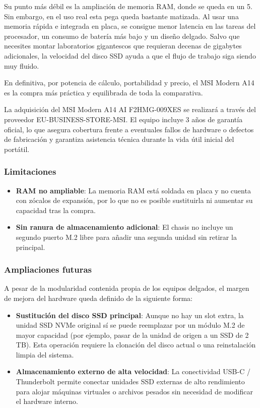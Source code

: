 \documentclass[11.5pt]{article}
\begin{document}
	Su punto más débil es la ampliación de memoria RAM, donde se queda en un 5. Sin embargo, en el uso real esta pega queda bastante matizada. Al usar una memoria rápida e integrada en placa, se consigue menor latencia en las tareas del procesador, un consumo de batería más bajo y un diseño delgado. Salvo que necesites montar laboratorios gigantescos que requieran decenas de gigabytes adicionales, la velocidad del disco SSD ayuda a que el flujo de trabajo siga siendo muy fluido.
	
	En definitiva, por potencia de cálculo, portabilidad y precio, el MSI Modern A14 es la compra más práctica y equilibrada de toda la comparativa.
	
	La adquisición del MSI Modern A14 AI F2HMG-009XES se realizará a través del proveedor EU-BUSINESS-STORE-MSI. El equipo incluye 3 años de garantía oficial, lo que asegura cobertura frente a eventuales fallos de hardware o defectos de fabricación y garantiza asistencia técnica durante la vida útil inicial del portátil.
	
	\subsubsection*{Limitaciones}
	
	\begin{itemize}
		\item \textbf{RAM no ampliable}: La memoria RAM está soldada en placa y no cuenta con zócalos de expansión, por lo que no es posible sustituirla ni aumentar su capacidad tras la compra.
		\item 	\textbf{Sin ranura de almacenamiento adicional}: El chasis no incluye un segundo puerto M.2 libre para añadir una segunda unidad sin retirar la principal.
	\end{itemize}
	
	\subsubsection*{Ampliaciones futuras}
	A pesar de la modularidad contenida propia de los equipos delgados, el margen de mejora del hardware queda definido de la siguiente forma:
	
	\begin{itemize}
		\item \textbf{Sustitución del disco SSD principal}: Aunque no hay un slot extra, la unidad SSD NVMe original sí se puede reemplazar por un módulo M.2 de mayor capacidad (por ejemplo, pasar de la unidad de origen a un SSD de 2 TB). Esta operación requiere la clonación del disco actual o una reinstalación limpia del sistema.
		\item 	\textbf{Almacenamiento externo de alta velocidad}: La conectividad USB-C / Thunderbolt permite conectar unidades SSD externas de alto rendimiento para alojar máquinas virtuales o archivos pesados sin necesidad de modificar el hardware interno.
	\end{itemize}
	
\end{document}
